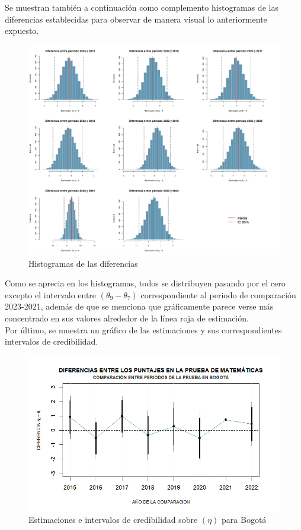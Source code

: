 \documentclass[12pt]{article}
\begin{document}
Se muestran también a continuación como complemento histogramas de las diferencias establecidas para observar de manera visual lo anteriormente expuesto. 

\newpage

\begin{figure}[H]
    \centering
    \includegraphics[width=1\linewidth]{Imagenes/GrillaHistogramas.png}
    \caption{Histogramas de las diferencias}
    \label{fig_enter_label}
\end{figure}

Como se aprecia en los histogramas, todos se distribuyen pasando por el cero excepto el intervalo entre $(\theta_9 - \theta_7)$ correspondiente al periodo de comparación 2023-2021, además de que se menciona que gráficamente parece verse más concentrado en sus valores alrededor de la línea roja de estimación.\\

Por último, se muestra un gráfico de las estimaciones y sus correspondientes intervalos de credibilidad.\\ 

\begin{figure}[H]
    \centering
    \includegraphics[width=1\linewidth]{Imagenes/Diferenacias.png}
    \caption{Estimaciones e intervalos de credibilidad sobre $(\eta)$ para Bogotá}
    \label{fig_enter_label}
\end{figure}
\end{document}
